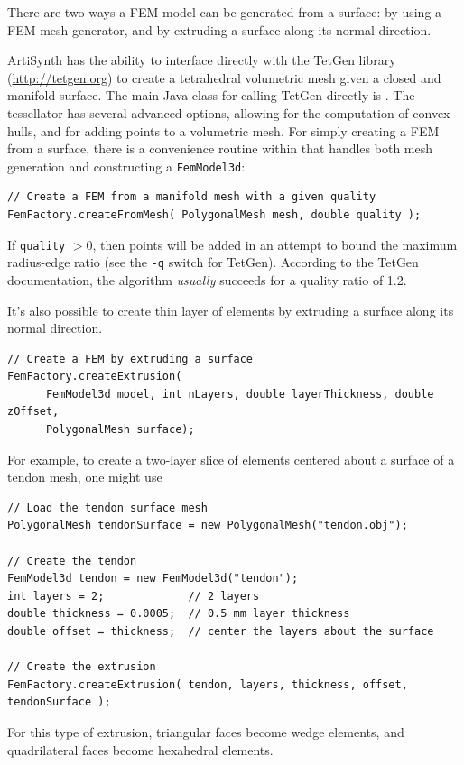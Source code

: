 There are two ways a FEM model can be generated from a surface: by using a
FEM mesh generator, and by extruding a surface along its normal direction.

ArtiSynth has the ability to interface directly with the TetGen library 
(\href{http://tetgen.org}{http://tetgen.org}) to create a tetrahedral 
volumetric mesh given a closed and manifold surface.  The main Java class for
calling TetGen directly is .
The tessellator has several advanced options, allowing for the computation of 
convex hulls, and for adding points to a volumetric mesh.  For simply creating
a FEM from a surface, there is a convenience routine within 
 that handles both mesh 
generation and constructing a {\tt FemModel3d}:
\begin{lstlisting}[]
// Create a FEM from a manifold mesh with a given quality
FemFactory.createFromMesh( PolygonalMesh mesh, double quality );
\end{lstlisting}
If {\tt quality} $>0$, then points will be added in an attempt to bound the
maximum radius-edge ratio (see the {\tt-q} switch for TetGen).  According
to the TetGen documentation, the algorithm \emph{usually} succeeds for a 
quality ratio of 1.2.

It's also possible to create thin layer of elements by extruding a surface
along its normal direction. 
\begin{lstlisting}[]
// Create a FEM by extruding a surface
FemFactory.createExtrusion(
      FemModel3d model, int nLayers, double layerThickness, double zOffset, 
      PolygonalMesh surface);
\end{lstlisting}
For example, to create a two-layer slice of elements centered about a 
surface of a tendon mesh, one might use
\begin{lstlisting}[]
// Load the tendon surface mesh
PolygonalMesh tendonSurface = new PolygonalMesh("tendon.obj");

// Create the tendon
FemModel3d tendon = new FemModel3d("tendon");
int layers = 2;             // 2 layers
double thickness = 0.0005;  // 0.5 mm layer thickness
double offset = thickness;  // center the layers about the surface

// Create the extrusion
FemFactory.createExtrusion( tendon, layers, thickness, offset, tendonSurface );
\end{lstlisting} 
For this type of extrusion, triangular faces become wedge elements, and 
quadrilateral faces become hexahedral elements.  


